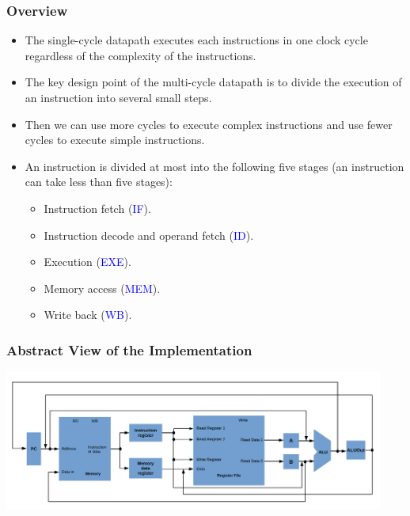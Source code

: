 \documentclass{beamer}
\begin{document}
\begin{frame}%
\frametitle{Overview}

\begin{itemize}

\item The single-cycle datapath executes each instructions in one clock cycle regardless
  of the complexity of the instructions.

  \vspace{0.2cm}

\item The key design point of the multi-cycle datapath is to divide the execution of an instruction
  into several small steps.

  \vspace{0.2cm}

\item Then we can use more cycles to execute complex instructions and use fewer cycles to execute simple
  instructions.

  \vspace{0.2cm}

\item An instruction is divided at most into the following five stages (an instruction can take less
  than five stages):
  \begin{itemize}
  \item Instruction fetch (\textcolor{blue}{IF}).
  \item Instruction decode and operand fetch (\textcolor{blue}{ID}).
  \item Execution (\textcolor{blue}{EXE}).
  \item Memory access (\textcolor{blue}{MEM}).
  \item Write back (\textcolor{blue}{WB}).
  \end{itemize}

\end{itemize}

\end{frame}

\begin{frame}%
\frametitle{Abstract View of the Implementation}

\begin{center}
\hspace*{-0.75cm}\includegraphics[width=12.5cm]{abstract_view_multi.pdf}
\end{center}

\end{frame}
\end{document}
